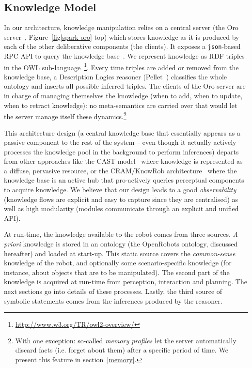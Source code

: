 \documentclass[preprint,3p,times]{elsarticle}
\newcommand{\ie}{i.e.\xspace}
\begin{document}
\subsection{Knowledge Model}

In our architecture, knowledge manipulation relies on a central server (the {\sc
Oro} server~\cite{Lemaignan2010}, Figure~\ref{fig|spark-oro} top) which stores
knowledge as it is produced by each of the other deliberative components (the
clients). It exposes a {\tt json}-based RPC API to query the knowledge
base~\cite{lemaignan2012kbapi}.  We represent knowledge as RDF triples in the
OWL sub-language~\footnote{\url{http://www.w3.org/TR/owl2-overview/}}. Every
time triples are added or removed from the knowledge base, a Description Logics
reasoner ({\sc Pellet}~\cite{sirin2007pellet})
classifies the whole ontology and inserts all possible inferred triples.  The
clients of the {\sc Oro} server are in charge of managing themselves the
knowledge (when to add, when to update, when to retract knowledge): no
meta-semantics are carried over that would let the server manage itself these
dynamics.\footnote{With one exception: so-called \emph{memory profiles} let the
server automatically discard facts (\ie forget about them) after a specific
period of time. We present this feature in section~\ref{memory}.}

This architecture design (a central knowledge base that essentially appears as a
passive component to the rest of the system -- even though it actually actively
processes the knowledge pool in the background to perform inferences)
departs from other approaches like the CAST model~\cite{Hawes2007} where
knowledge is represented as a diffuse, pervasive resource, or the CRAM/KnowRob
architecture~\cite{Beetz2010} where the knowledge base is an active hub that
pro-actively queries perceptual components to acquire knowledge. We believe that
our design leads to a good \emph{observability} (knowledge flows are explicit
and easy to capture since they are centralised) as well as high modularity
(modules communicate through an explicit and unified API).

At run-time, the knowledge available to the robot comes from three sources. {\it
A priori} knowledge is stored in an ontology (the {\sc OpenRobots} ontology,
discussed hereafter) and loaded at start-up. This static source covers the
\emph{common-sense} knowledge of the robot, and optionally some
scenario-specific knowledge (for instance, about objects that are to be
manipulated). The second part of the knowledge is acquired at run-time from
perception, interaction and planning. The next sections go into details of these
processes. Lastly, the third source of symbolic statements comes from the
inferences produced by the reasoner.
\end{document}
